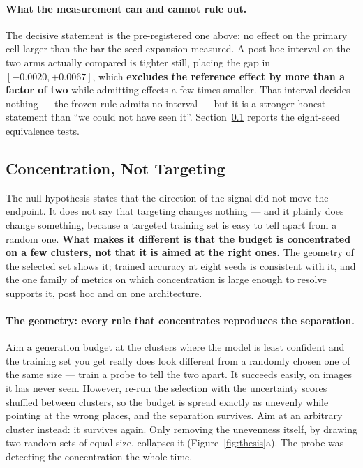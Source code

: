 \documentclass{article}
\begin{document}
\paragraph{What the measurement can and cannot rule out.} The decisive statement is the
pre-registered one above: no effect on the primary cell larger than the bar the seed expansion
measured. A post-hoc interval on the two arms actually compared is tighter still,
placing the gap in $[-0.0020, +0.0067]$, which \textbf{excludes the reference effect by more than a
factor of two} while admitting effects a few times smaller. That interval decides nothing --- the
frozen rule admits no interval --- but it is a stronger honest statement than ``we could not have
seen it''. Section~\ref{sec:concentration} reports the eight-seed equivalence tests.

\subsection{Concentration, Not Targeting}
\label{sec:concentration}
The null hypothesis states that the direction of the signal did not move the endpoint. It does not say that targeting
changes nothing --- and it plainly does change something, because a targeted training set is easy to
tell apart from a random one. \textbf{What makes it different is that the budget is concentrated on
a few clusters, not that it is aimed at the right ones.} The geometry of the selected set shows it;
trained accuracy at eight seeds is consistent with it, and the one family of metrics on which
concentration is large enough to resolve supports it, post hoc and on one architecture.

\paragraph{The geometry: every rule that concentrates reproduces the separation.} Aim a generation
budget at the clusters where the model is least confident and the training set you get really does
look different from a randomly chosen one of the same size --- train a probe to tell the two apart. It succeeds easily, on images it has never seen. However, re-run the selection with the uncertainty
scores shuffled between clusters, so the budget is spread exactly as unevenly while pointing at the
wrong places, and the separation survives. Aim at an arbitrary cluster instead: it survives again.
Only removing the unevenness itself, by drawing two random sets of equal size, collapses it (Figure~\ref{fig:thesis}a). The probe was detecting the concentration the whole time.
\end{document}
